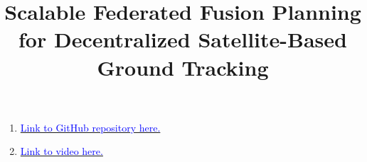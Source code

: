 \documentclass[conference]{IEEEtran}
\begin{document}
\title{Scalable Federated Fusion Planning for Decentralized Satellite-Based Ground Tracking\\
}

\author{
}

\maketitle

\begin{enumerate}
    \item \href{https://github.com/nolans12/Satellite-DDF}{{\textcolor{blue}{Link to GitHub repository here.}}}
    \item \href{https://youtu.be/t9Bo5KCvhZA}{{\textcolor{blue}{Link to video here.}}}
\end{enumerate}














\end{document}
